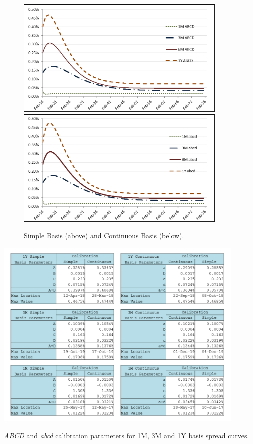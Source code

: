 \documentclass{article}
\begin{document}
\begin{figure}[t]
\centering
\includegraphics[width=0.9\textwidth]{SimpleBasis.png}\vfil
\includegraphics[width=0.9\textwidth]{ContinuousBasis.png}
\caption{Simple Basis (above) and Continuous Basis (below).}
\label{SimpleAndContinuousBasis}
\end{figure}

\begin{table}
\centering
\includegraphics[width=0.9\textwidth]{Simple&ContBasisParam.png}
\caption{\textit{ABCD} and \textit{abcd} calibration parameters for 1M, 3M and 1Y basis spread curves.}
\label{tab:BasisParam}
\end{table}
\end{document}
